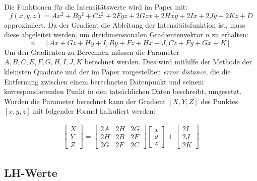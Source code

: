 Die Funktionen für die Intensitätswerte wird im Paper mit:
\begin{equation}
	f(x,y,z) = Ax^{2}+By^{2}+Cz^{2}+2Fyz+2Gzx+2Hxy+2Ix+2Jy+2Kz+D
\end{equation}
approximiert. Da der Gradient die Ableitung der Intensitätsfunktion ist, muss diese abgeleitet werden, um dreidimensionalen Gradientenvektor $n$ zu erhalten:
\begin{equation}
	n = [Ax+Gz+Hy+I, By+Fz+Hx+J, Cz + Fy + Gx + K]
\end{equation}
Um den Gradienten zu Berechnen müssen die Parameter $A,B,C,E,F,G,H,I,J,K$  berechnet werden. Dies wird mithilfe der Methode der kleinsten Quadrate und der im Paper vorgestellten \textit{error distance}, die die Entfernung zwischen einem berechneten Datenpunkt und seinem korrespondierenden Punkt in den tatsächlichen Daten beschreibt, umgesetzt.
\newline
Wurden die Parameter berechnet kann der Gradient $[X, Y, Z]$ des Punktes $[x, y, z]$ mit folgender Formel kalkuliert werden:

\begin{align}
\begin{bmatrix}
           X \\
           Y \\
           Z
         \end{bmatrix}    
 	= \begin{bmatrix}
           2A & 2H & 2G \\
           2H & 2B & 2F \\
           2G & 2F & 2C
         \end{bmatrix}
         \begin{bmatrix}
           x \\
           y \\
           z
         \end{bmatrix}
	+\begin{bmatrix}
           2I \\
           2J \\
           2K
         \end{bmatrix}
  \end{align}




\subsection{LH-Werte}

